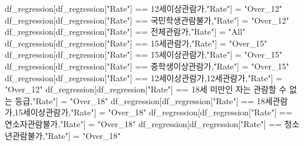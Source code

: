 \documentclass[
]{article}
\newenvironment{Shaded}{\begin{snugshade}}{\end{snugshade}}
\newcommand{\NormalTok}[1]{#1}
\newcommand{\OtherTok}[1]{\textcolor[rgb]{0.56,0.35,0.01}{#1}}
\newcommand{\SpecialCharTok}[1]{\textcolor[rgb]{0.00,0.00,0.00}{#1}}
\newcommand{\StringTok}[1]{\textcolor[rgb]{0.31,0.60,0.02}{#1}}
\begin{document}
\begin{Shaded}
\begin{Highlighting}[]
\NormalTok{df\_regression[df\_regression[}\StringTok{"Rate"}\NormalTok{] }\SpecialCharTok{==} \StringTok{\textquotesingle{}12세이상관람가\textquotesingle{}}\NormalTok{,}\StringTok{"Rate"}\NormalTok{] }\OtherTok{=} \StringTok{"Over\_12"}
\NormalTok{df\_regression[df\_regression[}\StringTok{"Rate"}\NormalTok{] }\SpecialCharTok{==} \StringTok{\textquotesingle{}국민학생관람불가\textquotesingle{}}\NormalTok{,}\StringTok{"Rate"}\NormalTok{] }\OtherTok{=} \StringTok{"Over\_12"}
\NormalTok{df\_regression[df\_regression[}\StringTok{"Rate"}\NormalTok{] }\SpecialCharTok{==} \StringTok{\textquotesingle{}전체관람가\textquotesingle{}}\NormalTok{,}\StringTok{"Rate"}\NormalTok{] }\OtherTok{=} \StringTok{"All"}
\NormalTok{df\_regression[df\_regression[}\StringTok{"Rate"}\NormalTok{] }\SpecialCharTok{==} \StringTok{\textquotesingle{}15세관람가\textquotesingle{}}\NormalTok{,}\StringTok{"Rate"}\NormalTok{] }\OtherTok{=} \StringTok{"Over\_15"}
\NormalTok{df\_regression[df\_regression[}\StringTok{"Rate"}\NormalTok{] }\SpecialCharTok{==} \StringTok{\textquotesingle{}15세이상관람가\textquotesingle{}}\NormalTok{,}\StringTok{"Rate"}\NormalTok{] }\OtherTok{=} \StringTok{"Over\_15"}
\NormalTok{df\_regression[df\_regression[}\StringTok{"Rate"}\NormalTok{] }\SpecialCharTok{==} \StringTok{\textquotesingle{}중학생이상관람가\textquotesingle{}}\NormalTok{,}\StringTok{"Rate"}\NormalTok{] }\OtherTok{=} \StringTok{"Over\_15"}
\NormalTok{df\_regression[df\_regression[}\StringTok{"Rate"}\NormalTok{] }\SpecialCharTok{==} \StringTok{\textquotesingle{}12세이상관람가,12세관람가\textquotesingle{}}\NormalTok{,}\StringTok{"Rate"}\NormalTok{] }\OtherTok{=} \StringTok{"Over\_12"}
\NormalTok{df\_regression[df\_regression[}\StringTok{"Rate"}\NormalTok{] }\SpecialCharTok{==} \StringTok{\textquotesingle{}18세 미만인 자는 관람할 수 없는 등급\textquotesingle{}}\NormalTok{,}\StringTok{"Rate"}\NormalTok{] }\OtherTok{=} \StringTok{"Over\_18"}
\NormalTok{df\_regression[df\_regression[}\StringTok{"Rate"}\NormalTok{] }\SpecialCharTok{==} \StringTok{\textquotesingle{}18세관람가,15세이상관람가\textquotesingle{}}\NormalTok{,}\StringTok{"Rate"}\NormalTok{] }\OtherTok{=} \StringTok{"Over\_18"}
\NormalTok{df\_regression[df\_regression[}\StringTok{"Rate"}\NormalTok{] }\SpecialCharTok{==} \StringTok{\textquotesingle{}연소자관람불가\textquotesingle{}}\NormalTok{,}\StringTok{"Rate"}\NormalTok{] }\OtherTok{=} \StringTok{"Over\_18"}
\NormalTok{df\_regression[df\_regression[}\StringTok{"Rate"}\NormalTok{] }\SpecialCharTok{==} \StringTok{\textquotesingle{}청소년관람불가\textquotesingle{}}\NormalTok{,}\StringTok{"Rate"}\NormalTok{] }\OtherTok{=} \StringTok{"Over\_18"}

\end{Highlighting}
\end{Shaded}
\end{document}
